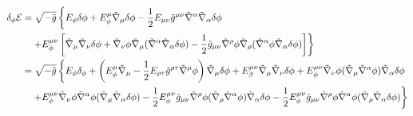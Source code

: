 \begin{align}
  \delta_\phi\mathcal{E} &=\sqrt{-\tilde{g}}\left\{E_\phi\delta\phi +E^\mu_\phi \tilde{\nabla}_\mu\delta\phi -\frac{1}{2}E_{\mu\nu }\tilde{g}^{\mu\nu }\tilde{\nabla}^\alpha \tilde{\nabla}_\alpha \delta\phi \right.\\
  &  \quad \left. + E^{\mu\nu }_\phi \left[\tilde{\nabla}_\mu \tilde{\nabla}_\nu \delta\phi +\tilde{\nabla}_\nu\phi\tilde{\nabla}_\mu (\tilde{\nabla}^\alpha\tilde{\nabla}_\alpha\delta\phi )-\frac{1}{2}\tilde{g}_{\mu\nu }\tilde{\nabla}^\rho\phi\tilde{\nabla}_\rho (\tilde{\nabla}^\alpha\phi\tilde{\nabla}_\alpha\delta\phi )\right]\right\} \\
  &=\sqrt{-\tilde{g}}\left\{E_\phi\delta_\phi+\left(E^\mu_\phi\tilde{\nabla}_\mu-\frac{1}{2}E_{\rho\tau }\tilde{g}^{\rho\tau }\tilde{\nabla}^\mu\phi \right)\tilde{\nabla}_\mu\delta\phi +E^{\mu\nu }_\beta\tilde{\nabla}_\mu\tilde{\nabla}_\nu \delta\phi +E^{\mu\nu }_\phi\tilde{\nabla}_\nu \phi(\tilde{\nabla}_\mu \tilde{\nabla}^\alpha\phi )\tilde{\nabla}_\alpha\delta\phi \right.\\
  &\left.\quad + E^{\mu\nu }_\phi\tilde{\nabla}_\nu\phi\tilde{\nabla}^\alpha \phi(\tilde{\nabla}_\mu\tilde{\nabla}_\alpha\delta\phi )-\frac{1}{2}E^{\mu\nu}_\phi \tilde{g}_{\mu\nu }\tilde{\nabla}^\rho\phi(\tilde{\nabla}_\rho\tilde{\nabla}^\alpha \phi )\tilde{\nabla}_\alpha\delta\phi  -\frac{1}{2}E^{\mu\nu }_\phi\tilde{g}_{\mu\nu }\tilde{\nabla}^\rho\phi\tilde{\nabla}^\alpha\phi(\tilde{\nabla}_\rho\tilde{\nabla}_\alpha\delta\phi )\right\}
\end{align}

